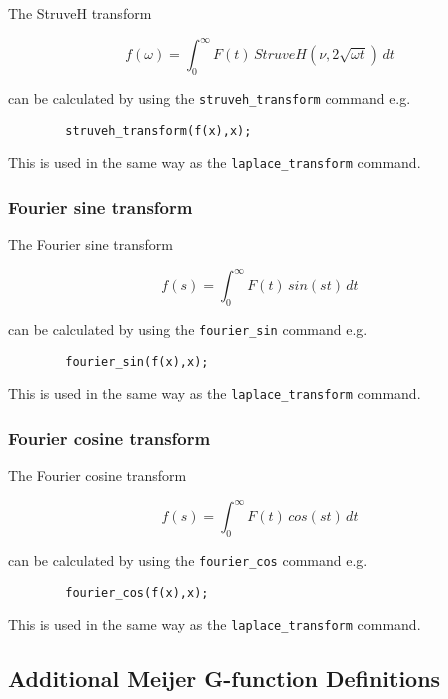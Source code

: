 The StruveH transform

\begin{displaymath}
f(\omega) = \int_{0}^{\infty} F(t) \,StruveH(\nu,2\sqrt{\omega t}) \,dt
\end{displaymath}

can be calculated by using the \verb+struveh_transform+ command e.g.

\begin{verbatim}
        struveh_transform(f(x),x);
\end{verbatim}

This is used in the same way as the \verb+laplace_transform+ command.

\subsubsection{Fourier sine transform}

The Fourier sine transform 

\begin{displaymath}
f(s) = \int_{0}^{\infty} F(t) \,sin (st) \,dt 
\end{displaymath}

can be calculated by using the \verb+fourier_sin+ command e.g.
\begin{verbatim}
        fourier_sin(f(x),x);    
\end{verbatim}

This is used in the same way as the \verb+laplace_transform+ command.

\subsubsection{Fourier cosine transform}

The Fourier cosine transform 

\begin{displaymath}
f(s) = \int_{0}^{\infty} F(t) \,cos (st) \,dt 
\end{displaymath}

can be calculated by using the \verb+fourier_cos+ command e.g.
\begin{verbatim}
        fourier_cos(f(x),x);
\end{verbatim}

This is used in the same way as the \verb+laplace_transform+ command.

\subsection{Additional Meijer G-function Definitions}

